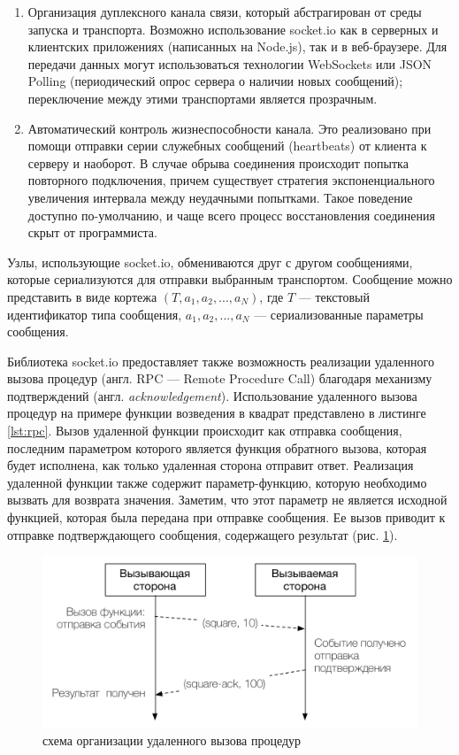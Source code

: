\documentclass[a4paper,14pt,href,draft]{article}
\begin{document}
\begin{enumerate}
  \item Организация дуплексного канала связи, который абстрагирован от среды запуска и транспорта. Возможно использование
  socket.io как в серверных и клиентских приложениях (написанных на Node.js), так и в веб-браузере. Для передачи данных
  могут использоваться технологии WebSockets или JSON Polling (периодический опрос сервера о наличии новых сообщений);
  переключение между этими транспортами является прозрачным.

  \item Автоматический контроль жизнеспособности канала. Это реализовано при помощи отправки серии служебных сообщений
  (heartbeats) от клиента к серверу и наоборот. В случае обрыва соединения происходит попытка повторного подключения,
  причем существует стратегия экспоненциального увеличения интервала между неудачными попытками. Такое поведение доступно
  по-умолчанию, и чаще всего процесс восстановления соединения скрыт от программиста.
\end{enumerate}

Узлы, использующие socket.io, обмениваются друг с другом сообщениями, которые сериализуются для отправки выбранным
транспортом. Сообщение можно представить в виде кортежа $(T, a_1, a_2, ..., a_N)$, где $T$ --- текстовый идентификатор
типа сообщения, $a_1, a_2, ..., a_N $ --- сериализованные параметры сообщения.

Библиотека socket.io предоставляет также возможность реализации удаленного вызова процедур (англ. RPC --- Remote
Procedure Call) благодаря механизму подтверждений (англ. \textit{acknowledgement}). Использование удаленного вызова
процедур на примере функции возведения в квадрат представлено в листинге \ref{lst:rpc}. Вызов удаленной функции происходит
как отправка сообщения, последним параметром которого является функция обратного вызова, которая будет исполнена, как только
удаленная сторона отправит ответ. Реализация удаленной функции также содержит параметр-функцию, которую необходимо вызвать
для возврата значения. Заметим, что этот параметр не является исходной функцией, которая была передана при отправке
сообщения. Ее вызов приводит к отправке подтверждающего сообщения, содержащего результат (рис. \ref{fig:RpcSchema}).

\begin{figure}[htbp]
\begin{center}
  \includegraphics[scale=0.8]{rpc-schema.pdf}
    \caption{схема организации удаленного вызова процедур}
    \label{fig:RpcSchema}
\end{center}
\end{figure}
\end{document}
